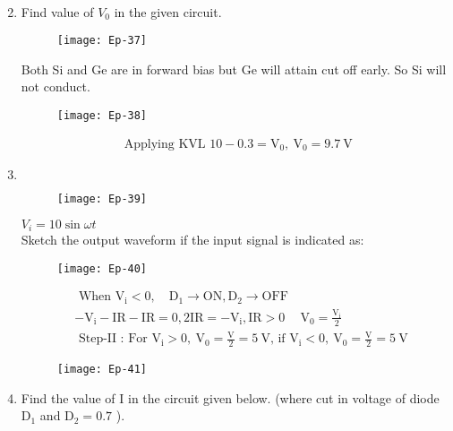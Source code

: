 \begin{enumerate}
\begin{answer}
\begin{align*}
		\end{align*}
	\end{answer}
	\item Find value of $V_{0}$ in the given circuit.
	\begin{figure}[H]
		\centering
		\texttt{[image: Ep-37]}
	\end{figure}
	\begin{answer}
		Both Si and Ge are in forward bias but Ge will attain cut off early. So Si will not conduct.
		\begin{figure}[H]
			\centering
			\texttt{[image: Ep-38]}
		\end{figure}
		\begin{align*}
		\text { Applying KVL } 10-0.3=\mathrm{V}_{0}, \mathrm{~V}_{0}=9.7 \mathrm{~V}
		\end{align*}
	\end{answer}
	\item 	$\left. \right. $\\
	\begin{figure}[H]
		\centering
		\texttt{[image: Ep-39]}
	\end{figure}
$V_{i}=10 \sin \omega t$\\
	Sketch the output waveform if the input signal is indicated as:
	\begin{figure}[H]
		\centering
		\texttt{[image: Ep-40]}
	\end{figure}
	\begin{answer}
		\begin{align*}
		&\text { When } \mathrm{V}_{\mathrm{i}}<0, \quad \mathrm{D}_{1} \rightarrow \mathrm{ON}, \mathrm{D}_{2} \rightarrow \mathrm{OFF}\\
		&-\mathrm{V}_{\mathrm{i}}-\mathrm{IR}-\mathrm{IR}=0,2 \mathrm{IR}=-\mathrm{V}_{\mathrm{i}}, \mathrm{IR}>0 \quad \mathrm{~V}_{0}=\frac{\mathrm{V}_{\mathrm{i}}}{2}\\
		&\text { Step-II : For } \mathrm{V}_{\mathrm{i}}>0, \mathrm{~V}_{0}=\frac{\mathrm{V}}{2}=5 \mathrm{~V} \text {, if } \mathrm{V}_{\mathrm{i}}<0, \mathrm{~V}_{0}=\frac{\mathrm{V}}{2}=5 \mathrm{~V}
		\end{align*}
		\begin{figure}[H]
			\centering
			\texttt{[image: Ep-41]}
		\end{figure}
	\end{answer}
	\item Find the value of $\mathrm{I}$ in the circuit given below. (where cut in voltage of diode $\mathrm{D}_{1}$ and $\mathrm{D}_{2}=0.7$ ).

\end{enumerate}
